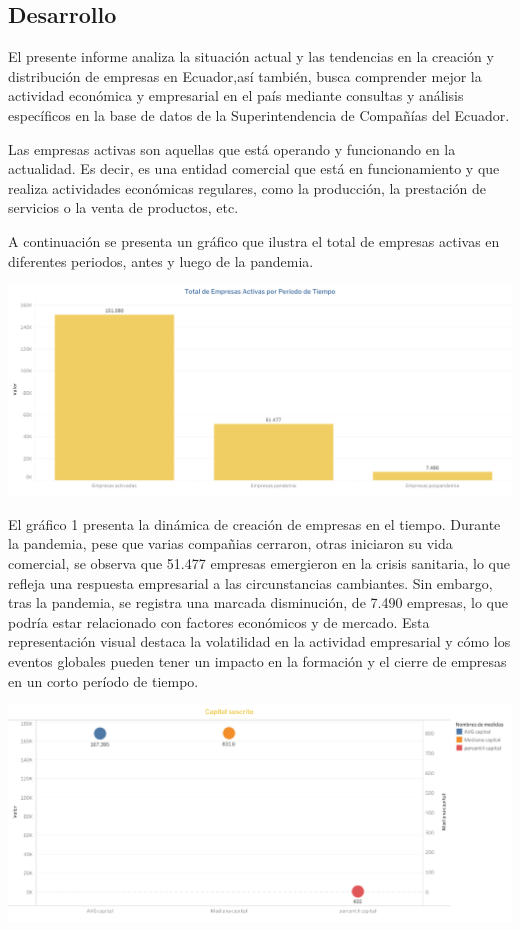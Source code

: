 \documentclass[
]{article}
\begin{document}
\hypertarget{desarrollo}{%
\subsection{\texorpdfstring{\textbf{Desarrollo}}{Desarrollo}}\label{desarrollo}}

El presente informe analiza la situación actual y las tendencias en la
creación y distribución de empresas en Ecuador,así también, busca
comprender mejor la actividad económica y empresarial en el país
mediante consultas y análisis específicos en la base de datos de la
Superintendencia de Compañías del Ecuador.

Las empresas activas son aquellas que está operando y funcionando en la
actualidad. Es decir, es una entidad comercial que está en
funcionamiento y que realiza actividades económicas regulares, como la
producción, la prestación de servicios o la venta de productos, etc.

A continuación se presenta un gráfico que ilustra el total de empresas
activas en diferentes periodos, antes y luego de la pandemia.

\includegraphics{imagenes/Hoja 2 (1).png}

El gráfico 1 presenta la dinámica de creación de empresas en el tiempo.
Durante la pandemia, pese que varias compañias cerraron, otras iniciaron
su vida comercial, se observa que 51.477 empresas emergieron en la
crisis sanitaria, lo que refleja una respuesta empresarial a las
circunstancias cambiantes. Sin embargo, tras la pandemia, se registra
una marcada disminución, de 7.490 empresas, lo que podría estar
relacionado con factores económicos y de mercado. Esta representación
visual destaca la volatilidad en la actividad empresarial y cómo los
eventos globales pueden tener un impacto en la formación y el cierre de
empresas en un corto período de tiempo.

\includegraphics{imagenes/Hoja 3.png}
\end{document}
